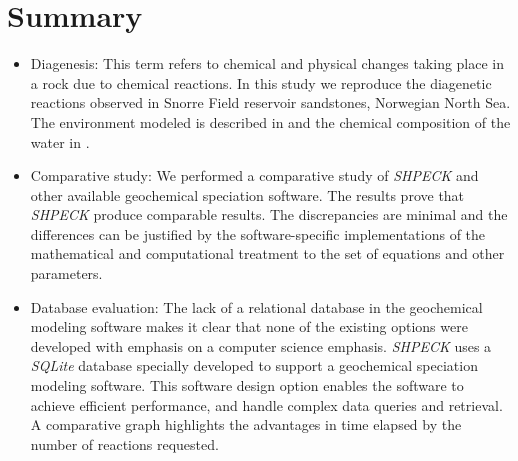 \newpage

\section{Summary}
\begin{itemize}
    \item Diagenesis: This term refers to chemical and physical changes taking place in a rock due to chemical reactions. In this study we reproduce the diagenetic reactions observed in Snorre Field reservoir sandstones, Norwegian North Sea. 
    The environment modeled is described in \cite{Morad:90} and the chemical composition of the water in \cite{Nordstrom:79}.
    \item Comparative study: We performed a comparative study of \emph{SHPECK} and other available geochemical speciation software. The results prove that \emph{SHPECK} produce comparable results. The discrepancies are minimal and the differences can be justified by the software-specific implementations of the mathematical and computational treatment to the set of equations and other parameters. 
    \item Database evaluation: The lack of a relational database in the geochemical modeling software makes it clear that none of the existing options were developed with emphasis on a computer science emphasis. \emph{SHPECK} uses a \emph{SQLite} database specially developed to support a geochemical speciation modeling software. This software design option enables the software to achieve efficient performance, and handle complex data queries and retrieval. A comparative graph highlights the advantages in time elapsed by the number of reactions requested.
\end{itemize}